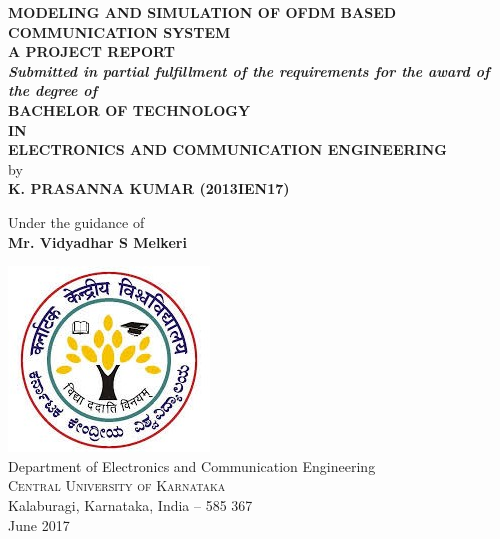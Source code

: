 \documentclass[12pt]{report}
\renewcommand{\baselinestretch}{1.5}
\begin{document}
\begin{titlepage}

\begin{center}

\renewcommand{\baselinestretch}{1.5}
\Large \textbf {MODELING AND SIMULATION OF OFDM BASED COMMUNICATION SYSTEM}\\[0.8in]


\normalsize
\textbf{ A PROJECT REPORT}\\[0.1in]
 \small
       \textit{\textbf{Submitted in partial fulfillment of
        the requirements for the award of the degree of}}\\[0.3in]
        
\normalsize
       \textbf{ BACHELOR OF TECHNOLOGY \\IN\\ ELECTRONICS AND COMMUNICATION ENGINEERING}\\[0.6in]

 by \\
\textbf{K. PRASANNA KUMAR (2013IEN17)}




\vspace{.3in}
Under the guidance of\\
{\textbf{Mr. Vidyadhar S Melkeri}}\\[0.1in]

\vfill

\includegraphics[scale=0.7]{download.jpg}\\[0.1in]
{Department of Electronics and Communication Engineering}\\
\normalsize
\textsc{Central University of Karnataka}\\
Kalaburagi, Karnataka, India -- 585 367 \\
June 2017

\end{center}

\end{titlepage}
\end{document}
